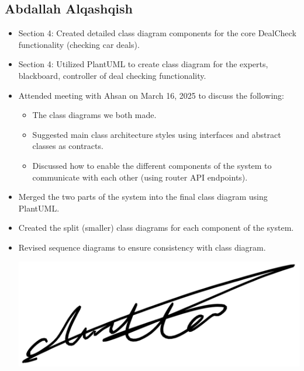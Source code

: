 \documentclass[]{article}
\begin{document}
\subsection{Abdallah Alqashqish}
\begin{itemize}
  \item Section 4: Created detailed class diagram components for the core DealCheck functionality (checking car deals).
  \item Section 4: Utilized PlantUML to create class diagram for the experts, blackboard, controller of deal checking functionality.
  \item Attended meeting with Ahsan on March 16, 2025 to discuss the following:
    \begin{itemize}
      \item The class diagrams we both made.
      \item Suggested main class architecture styles using interfaces and abstract classes as contracts.
      \item Discussed how to enable the different components of the system to communicate with each other (using router API endpoints).
    \end{itemize}
  \item Merged the two parts of the system into the final class diagram using PlantUML.
  \item Created the split (smaller) class diagrams for each component of the system.
  \item Revised sequence diagrams to ensure consistency with class diagram.
  \begin{center}
    \includegraphics[scale=0.1]{abdallah.jpg}
  \end{center}
\end{itemize}

\newpage
\end{document}
